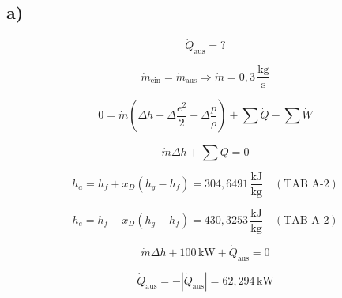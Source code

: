 

\subsection*{a)}

\[
\dot{Q}_{\text{aus}} = ?
\]

\[
\dot{m}_{\text{ein}} = \dot{m}_{\text{aus}} \Rightarrow \dot{m} = 0,3 \, \frac{\text{kg}}{\text{s}}
\]


\[
0 = \dot{m} \left( \Delta h + \Delta \frac{e^2}{2} + \Delta \frac{p}{\rho} \right) + \sum \dot{Q} - \sum \dot{W}
\]

\[
\dot{m} \Delta h + \sum \dot{Q} = 0
\]

\[
h_a = h_f + x_D (h_g - h_f) = 304,6491 \, \frac{\text{kJ}}{\text{kg}} \quad (\text{TAB A-2})
\]

\[
h_e = h_f + x_D (h_g - h_f) = 430,3253 \, \frac{\text{kJ}}{\text{kg}} \quad (\text{TAB A-2})
\]

\[
\dot{m} \Delta h + 100 \, \text{kW} + \dot{Q}_{\text{aus}} = 0
\]

\[
\dot{Q}_{\text{aus}} = - \left| \dot{Q}_{\text{aus}} \right| = 62,294 \, \text{kW}
\]